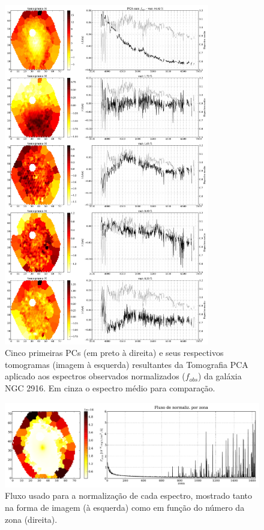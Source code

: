 \begin{figure}
    \includegraphics[width=0.8\textwidth]{figuras/K0277-tomo-obs-norm.pdf}
    \caption[Tomogramas de 1 a 5 da gal\'axia NGC 2916 - $f_{obs}$.]
    {Cinco primeiras PCs (em preto à direita) e seus respectivos tomogramas (imagem à esquerda) resultantes da
    Tomografia PCA aplicado aos espectros observados normalizados ($f_{obs}$) da galáxia NGC 2916. Em cinza o espectro
    médio para comparação.}
    \label{fig:K0277tomofobsnorm}
\end{figure}

\begin{figure}
    \includegraphics[width=1.\textwidth]{figuras/K0277-fobs_norm.pdf}
    \caption[Fluxos de normalização para cada zona da galáxia K0277.]
    {Fluxo usado para a normalização de cada espectro, mostrado tanto na forma de imagem (à esquerda) como em função do
    número da zona (direita).}
    \label{fig:K0277fobsnorm}
\end{figure}


